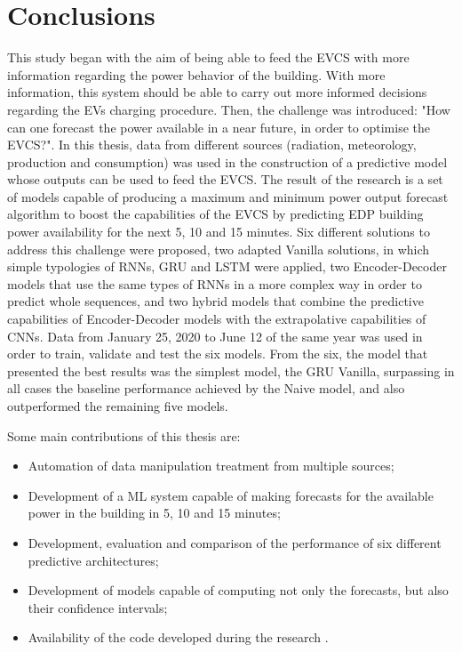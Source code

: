 \cleardoublepage
\label{chap:conclusion}

\section{Conclusions}

This study began with the aim of being able to feed the \ac{EVCS} with more information regarding the power behavior of the building. With more information, this system should be able to carry out more informed decisions regarding the \ac{EV}s charging procedure. Then, the challenge was introduced: "How can one forecast the power available in a near future, in order to optimise the \ac{EVCS}?". In this thesis, data from different sources (radiation, meteorology, production and consumption) was used in the construction of a predictive model whose outputs can be used to feed the \ac{EVCS}. The result of the research is a set of models capable of producing a maximum and minimum power output forecast algorithm to boost the capabilities of the \ac{EVCS} by predicting \ac{EDP} building power availability for the next 5, 10 and 15 minutes. Six different solutions to address this challenge were proposed, two adapted Vanilla solutions, in which simple typologies of \ac{RNN}s, \ac{GRU} and \ac{LSTM} were applied, two Encoder-Decoder models that use the same types of \ac{RNN}s in a more complex way in order to predict whole sequences, and two hybrid models that combine the predictive capabilities of Encoder-Decoder models with the extrapolative capabilities of \ac{CNN}s. Data from January 25, 2020 to June 12 of the same year was used in order to train, validate and test the six models. From the six, the model that presented the best results was the simplest model, the \ac{GRU} Vanilla, surpassing in all cases the baseline performance achieved by the Naive model, and also outperformed the remaining five models.

Some main contributions of this thesis are:
\begin{itemize}
\setlength\itemsep{0.1em}
    \item Automation of data manipulation treatment from multiple sources;
    \item Development of a \ac{ML} system capable of making forecasts for the available power in the building in 5, 10 and 15 minutes;
    \item Development, evaluation and comparison of the performance of six different predictive architectures;
    \item Development of models capable of computing not only the forecasts, but also their confidence intervals;
    \item Availability of the code developed during the research \cite{code}.
    
\end{itemize}

